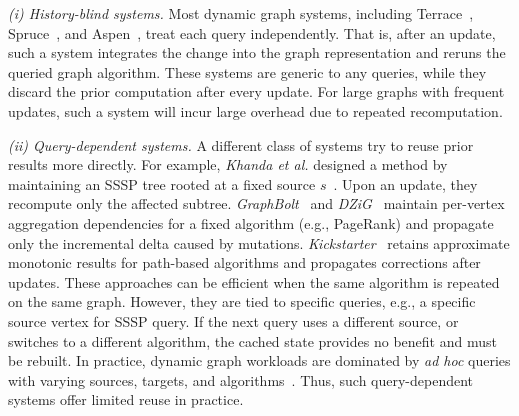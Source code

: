 \begin{maybecut}
\textit{(i) History-blind systems.}
Most dynamic graph systems, including Terrace~\cite{pandey2021terrace},
Spruce~\cite{shi2024spruce}, and Aspen~\cite{dhulipala2019low}, treat each query independently.
That is, after an update, such a system integrates the change into the graph representation and reruns the queried graph algorithm.
These systems are generic to any queries, while they discard the
prior computation after every update.
For large graphs with frequent updates, such a system will incur large overhead due to repeated recomputation.

\textit{(ii) Query-dependent systems.}
A different class of systems try to reuse prior results more
directly.
For example,
\textit{Khanda et al.} designed a method by maintaining
an SSSP tree rooted
at a fixed source $s$~\cite{khanda2021parallel}.
Upon an update, they recompute only the affected subtree.
\textit{GraphBolt}~\cite{mariappan2019graphbolt} and
\textit{DZiG}~\cite{mariappan2021dzig} maintain per-vertex aggregation
dependencies for a fixed algorithm (e.g., PageRank) and propagate only the
incremental delta caused by mutations.
\textit{Kickstarter}~\cite{vora2017kickstarter} retains approximate monotonic results for path-based algorithms and propagates corrections after updates.
These approaches can be efficient when the same algorithm is repeated on the same graph.
However, they are tied to specific queries, e.g., a specific source vertex for SSSP query.
If the next query uses a different source, or switches to a different algorithm,
the cached state provides no benefit and must be rebuilt.
In practice, dynamic graph workloads are dominated by \emph{ad hoc} queries
with varying sources, targets, and algorithms~\cite{Hanauer2022DynSurvey}.
Thus, such query-dependent systems offer limited reuse in practice.
\end{maybecut}



